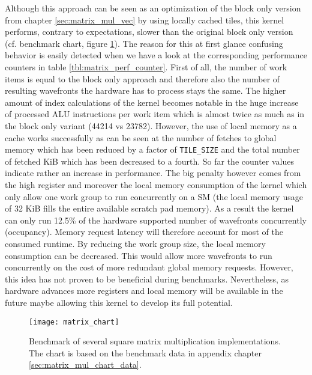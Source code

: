 Although this approach can be seen as an optimization of the block only version from chapter \ref{sec:matrix_mul_vec} by using locally cached tiles, this kernel performs, contrary to expectations, slower than the original block only version (cf. benchmark chart, figure \ref{fig:matrix_chart}). The reason for this at first glance confusing behavior is easily detected when we have a look at the corresponding performance counters in table \ref{tbl:matrix_perf_counter}.
First of all, the number of work items is equal to the block only approach and therefore also the number of resulting wavefronts the hardware has to process stays the same. The higher amount of index calculations of the kernel becomes notable in the huge increase of processed ALU instructions per work item which is almost twice as much as in the block only variant (44214 vs 23782). However, the use of local memory as a cache works successfully as can be seen at the number of fetches to global memory which has been reduced by a factor of \lstinline!TILE_SIZE! and the total number of fetched KiB which has been decreased to a fourth. So far the counter values indicate rather an increase in performance. The big penalty however comes from the high register and moreover the local memory consumption of the kernel which only allow one work group to run concurrently on a SM (the local memory usage of 32 KiB fills the entire available scratch pad memory). As a result the kernel can only run 12.5\% of the hardware supported number of wavefronts concurrently (occupancy). Memory request latency will therefore account for most of the consumed runtime. By reducing the work group size, the local memory consumption can be decreased. This would allow more wavefronts to run concurrently on the cost of more redundant global memory requests. However, this idea has not proven to be beneficial during benchmarks. Nevertheless, as hardware advances more registers and local memory will be available in the future maybe allowing this kernel to develop its full potential. 

\begin{figure}
	\centering
	\texttt{[image: matrix\_chart]}
	\caption{Benchmark of several square matrix multiplication implementations. The chart is based on the benchmark data in appendix chapter \ref{sec:matrix_mul_chart_data}.}
	\label{fig:matrix_chart}
\end{figure}

